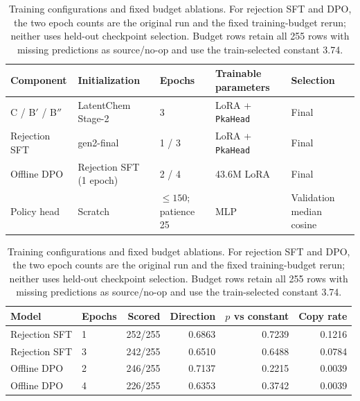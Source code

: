 \begin{table}[t]
\centering
\caption{Training configurations and fixed budget ablations. For rejection SFT and DPO, the two epoch counts are the original run and the fixed training-budget rerun; neither uses held-out checkpoint selection. Budget rows retain all 255 rows with missing predictions as source/no-op and use the train-selected constant 3.74.}
\label{tab:training_config}
\small
\setlength{\tabcolsep}{4pt}
\begin{tabular}{@{}p{3.0cm}p{2.6cm}p{1.4cm}p{3.6cm}p{3.3cm}@{}}
\toprule
Component & Initialization & Epochs & Trainable parameters & Selection \\
\midrule
C / B$'$ / B$''$ & LatentChem Stage-2 & 3 & LoRA + \texttt{PkaHead} & Final \\
Rejection SFT & gen2-final & 1 / 3 & LoRA + \texttt{PkaHead} & Final \\
Offline DPO & Rejection SFT (1 epoch) & 2 / 4 & 43.6M LoRA & Final \\
Policy head & Scratch & $\le 150$; patience 25 & MLP & Validation median cosine \\
\bottomrule
\end{tabular}

\vspace{0.5em}
\begin{tabular}{@{}llrrrr@{}}
\toprule
Model & Epochs & Scored & Direction & $p$ vs constant & Copy rate \\
\midrule
Rejection SFT & 1 & 252/255 & 0.6863 & 0.7239 & 0.1216 \\
Rejection SFT & 3 & 242/255 & 0.6510 & 0.6488 & 0.0784 \\
\midrule
Offline DPO & 2 & 246/255 & 0.7137 & 0.2215 & 0.0039 \\
Offline DPO & 4 & 226/255 & 0.6353 & 0.3742 & 0.0039 \\
\bottomrule
\end{tabular}
\end{table}
